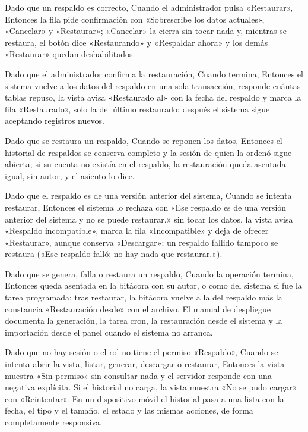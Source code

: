 {\item Dado que un respaldo es correcto, Cuando el administrador pulsa «Restaurar»,
      Entonces la fila pide confirmación con «Sobrescribe los datos actuales»,
      «Cancelar» y «Restaurar»; «Cancelar» la cierra sin tocar nada y, mientras se
      restaura, el botón dice «Restaurando» y «Respaldar ahora» y los demás «Restaurar»
      quedan deshabilitados.
\item Dado que el administrador confirma la restauración, Cuando termina, Entonces el
      sistema vuelve a los datos del respaldo en una sola transacción, responde cuántas
      tablas repuso, la vista avisa «Restaurado al» con la fecha del respaldo y marca la
      fila «Restaurado», solo la del último restaurado; después el sistema sigue
      aceptando registros nuevos.
\item Dado que se restaura un respaldo, Cuando se reponen los datos, Entonces el
      historial de respaldos se conserva completo y la sesión de quien la ordenó sigue
      abierta; si su cuenta no existía en el respaldo, la restauración queda asentada
      igual, sin autor, y el asiento lo dice.
\item Dado que el respaldo es de una versión anterior del sistema, Cuando se intenta
      restaurar, Entonces el sistema lo rechaza con «Ese respaldo es de una versión
      anterior del sistema y no se puede restaurar.» sin tocar los datos, la vista avisa
      «Respaldo incompatible», marca la fila «Incompatible» y deja de ofrecer
      «Restaurar», aunque conserva «Descargar»; un respaldo fallido tampoco se restaura
      («Ese respaldo falló: no hay nada que restaurar.»).
\item Dado que se genera, falla o restaura un respaldo, Cuando la operación termina,
      Entonces queda asentada en la bitácora con su autor, o como del sistema si fue la
      tarea programada; tras restaurar, la bitácora vuelve a la del respaldo más la
      constancia «Restauración desde» con el archivo. El manual de despliegue documenta
      la generación, la tarea cron, la restauración desde el sistema y la importación
      desde el panel cuando el sistema no arranca.
\item Dado que no hay sesión o el rol no tiene el permiso «Respaldo», Cuando se intenta
      abrir la vista, listar, generar, descargar o restaurar, Entonces la vista muestra
      «Sin permiso» sin consultar nada y el servidor responde con una negativa
      explícita. Si el historial no carga, la vista muestra «No se pudo cargar» con
      «Reintentar». En un dispositivo móvil el historial pasa a una lista con la fecha,
      el tipo y el tamaño, el estado y las mismas acciones, de forma completamente
      responsiva.}

